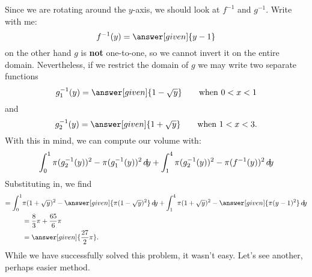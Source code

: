 \documentclass{ximera}
\begin{document}
Since we are rotating around the $y$-axis, we should look at $f^{-1}$
and $g^{-1}$. Write with me:
\[
f^{-1}(y) = \answer[given]{y-1}
\]
on the other hand $g$ is \textbf{not} one-to-one, so
we cannot invert it on the entire domain. Nevertheless, if we restrict
the domain of $g$ we may write two separate functions
\[
g^{-1}_1(y) = \answer[given]{1-\sqrt{y}}\qquad\text{when $0<x<1$}
\]
and
\[
g^{-1}_2(y) = \answer[given]{1+\sqrt{y}}\qquad\text{when $1<x<3$}.
\]
With this in mind, we can compute our volume with:
\[
\int_0^1 \pi(g^{-1}_2(y))^2-\pi(g_1^{-1}(y))^2\mathop{}\!d\! y+ \int_1^4
\pi(g^{-1}_2(y))^2-\pi(f^{-1}(y))^2\mathop{}\!d\! y
\]
Substituting in, we find
  \begin{align*}
  =\int_0^1 &\pi(1+\sqrt{y})^2-\answer[given]{\pi(1-\sqrt{y})^2}\d y+
  \int_1^4  \pi(1+\sqrt{y})^2-\answer[given]{\pi(y-1)^2}\d y\\
  &=\frac{8}{3}\pi + \frac{65}{6}\pi\\
  &=\answer[given]{\frac{27}{2}\pi}.
\end{align*}
While we have successfully solved this problem, it wasn't easy. Let's
see another, perhaps easier method.
\end{document}
